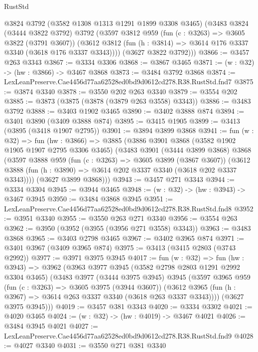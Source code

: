 \begin{lexlean}{RustStd}
\begin{coremodule}
      @3824
      @3792
      (@3582 @1308 @1313 @1291 @1899 @3308 @3465)
      (@3483
        @3824
        (@3444 @3822 @3792)
        @3792
        (@3597
          @3812
          @959
          (fun (c : @3263) => @3605 @3822 (@3791 @3607))
          (@3612 @3812 (fun (h : @3814) => @3614 @176 @3337 @3340 (@3618 @176 @3337 @3343))))
        (@3627 @3822 @3792)))
@3866 := @3457 @263 @3343
@3867 := @3334 @3306
@3868 := @3867 @3465
@3871 := (w : @32) -> (hw : @3866) -> @3467 @3868
@3873 := @3484 @3792 @3868
@3874 := LexLeanPreserve.Cae4456d77aa62528ed0bd9d0612cd278.R38.RustStd.fnd7
@3875 := @3874 @3340
@3878 := @3550 @202 @263 @3340
@3879 := @3554 @202
@3885 := @3873 (@3875 (@3878 (@3879 @263 @3558) @3343))
@3886 := @3483 @3792
@3888 := @3403 @1902 @3465
@3890 := @3402 @3888 @874
@3894 := @3401 @3890 (@3409 @3888 @874)
@3895 := @3415 @1905
@3899 := @3413 (@3895 (@3418 @1907 @2795))
@3901 := @3894 @3899 @3868
@3941 := fun (w : @32) =>
  fun (hw : @3866) =>
  @3885
    (@3886
      @3901
      @3868
      (@3582 @1902 @1905 @1907 @2795 @3306 @3465)
      (@3483
        @3901
        (@3444 @3899 @3868)
        @3868
        (@3597
          @3888
          @959
          (fun (c : @3263) => @3605 @3899 (@3867 @3607))
          (@3612 @3888 (fun (h : @3890) => @3614 @202 @3337 @3340 (@3618 @202 @3337 @3343))))
        (@3627 @3899 @3868)))
@3943 := @3457 @271 @3343
@3944 := @3334 @3304
@3945 := @3944 @3465
@3948 := (w : @32) -> (hw : @3943) -> @3467 @3945
@3950 := @3484 @3868 @3945
@3951 := LexLeanPreserve.Cae4456d77aa62528ed0bd9d0612cd278.R38.RustStd.fnd8
@3952 := @3951 @3340
@3955 := @3550 @263 @271 @3340
@3956 := @3554 @263
@3962 := @3950 (@3952 (@3955 (@3956 @271 @3558) @3343))
@3963 := @3483 @3868
@3965 := @3403 @2798 @3465
@3967 := @3402 @3965 @874
@3971 := @3401 @3967 (@3409 @3965 @874)
@3975 := @3413 (@3415 @2803 (@3743 @2992))
@3977 := @3971 @3975 @3945
@4017 := fun (w : @32) =>
  fun (hw : @3943) =>
  @3962
    (@3963
      @3977
      @3945
      (@3582 @2798 @2803 @1291 @2992 @3304 @3465)
      (@3483
        @3977
        (@3444 @3975 @3945)
        @3945
        (@3597
          @3965
          @959
          (fun (c : @3263) => @3605 @3975 (@3944 @3607))
          (@3612 @3965 (fun (h : @3967) => @3614 @263 @3337 @3340 (@3618 @263 @3337 @3343))))
        (@3627 @3975 @3945)))
@4019 := @3457 @381 @3343
@4020 := @3334 @3302
@4021 := @4020 @3465
@4024 := (w : @32) -> (hw : @4019) -> @3467 @4021
@4026 := @3484 @3945 @4021
@4027 := LexLeanPreserve.Cae4456d77aa62528ed0bd9d0612cd278.R38.RustStd.fnd9
@4028 := @4027 @3340
@4031 := @3550 @271 @381 @3340

\end{coremodule}
\end{lexlean}
